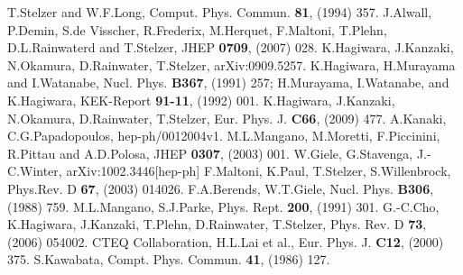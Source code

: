 \begin{thebibliography}{15}
T.Stelzer and W.F.Long, Comput. Phys. Commun. \textbf{81}, (1994) 357.
J.Alwall, P.Demin, S.de Visscher, R.Frederix, M.Herquet,
F.Maltoni, T.Plehn, D.L.Rainwaterd and T.Stelzer, JHEP \textbf{0709}, (2007) 028.
K.Hagiwara, J.Kanzaki, N.Okamura, D.Rainwater, T.Stelzer, arXiv:0909.5257.
K.Hagiwara, H.Murayama and I.Watanabe,
	Nucl. Phys. \textbf{B367}, (1991) 257; H.Murayama, I.Watanabe, and K.Hagiwara, KEK-Report
	\textbf{91-11}, (1992) 001.
K.Hagiwara, J.Kanzaki, N.Okamura, D.Rainwater,
	T.Stelzer, Eur. Phys. J. \textbf{C66}, (2009) 477. 
A.Kanaki, C.G.Papadopoulos, hep-ph/0012004v1.
M.L.Mangano, M.Moretti, F.Piccinini, R.Pittau and A.D.Polosa, JHEP \textbf{0307}, (2003) 001.
W.Giele, G.Stavenga, J.-C.Winter, arXiv:1002.3446[hep-ph]
F.Maltoni, K.Paul, T.Stelzer, S.Willenbrock, Phys.Rev. D \textbf{67}, (2003) 014026.
F.A.Berends, W.T.Giele, Nucl. Phys. \textbf{B306}, (1988) 759. 
M.L.Mangano, S.J.Parke, Phys. Rept. \textbf{200}, (1991) 301.
G.-C.Cho, K.Hagiwara, J.Kanzaki, T.Plehn,
	D.Rainwater, T.Stelzer, Phys. Rev. D \textbf{73}, (2006) 054002.
CTEQ Collaboration, H.L.Lai et al., Eur. Phys. J. \textbf{C12}, (2000) 375.
S.Kawabata, Compt. Phys. Commun. \textbf{41}, (1986) 127.
\end{thebibliography}




